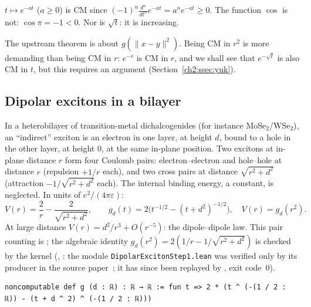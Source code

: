 \begin{example}
$t\mapsto e^{-at}$ ($a\ge0$) is CM since $(-1)^n\frac{d^n}{dt^n}e^{-at}=a^ne^{-at}\ge0$. The function $\cos$ is not:
$\cos\pi=-1<0$. Nor is $\sqrt t$: it is increasing.
\end{example}

\begin{remark}[why the variable $t=r^2$?]
The upstream theorem is about $g(\|x-y\|^2)$. Being CM in $r^2$ is more demanding than being CM in $r$: $e^{-r}$ is CM in $r$,
and we shall see that $e^{-\sqrt t}$ is also CM in $t$, but this requires an argument (Section~\ref{ch2:ssec:yuk}).
\end{remark}

\subsection{Dipolar excitons in a bilayer}\label{ch2:ssec:dip}

\begin{physbox}
In a heterobilayer of transition-metal dichalcogenides (for instance MoSe$_2$/WSe$_2$), an ``indirect'' exciton is an
electron in one layer, at height $d$, bound to a hole in the other layer, at height $0$, at the same in-plane position.
Two excitons at in-plane distance $r$ form four Coulomb pairs: electron--electron and hole--hole at distance $r$
(repulsion $+1/r$ each), and two cross pairs at distance $\sqrt{r^2+d^2}$ (attraction $-1/\sqrt{r^2+d^2}$ each). The
internal binding energy, a constant, is neglected. In units of $e^2/(4\pi\varepsilon)$:
\[V(r)=\frac2r-\frac2{\sqrt{r^2+d^2}},\qquad g_d(t)=2\bigl(t^{-1/2}-(t+d^2)^{-1/2}\bigr),\quad V(r)=g_d(r^2).\]
At large distance $V(r)=d^2/r^3+O(r^{-5})$: the dipole--dipole law. This pair counting is \tierC{}; the algebraic
identity $g_d(r^2)=2(1/r-1/\sqrt{r^2+d^2})$ is checked by the kernel (, \tierA{}: the module \texttt{DipolarExcitonStep1.lean} was verified only by its producer in the source paper~\cite{ch2dip}; it has since been replayed by , exit code~0).
\end{physbox}

\begin{leanbox}
\begin{lstlisting}[style=chdeux]
noncomputable def g (d : ℝ) : ℝ → ℝ := fun t => 2 * (t ^ (-(1 / 2 : ℝ)) - (t + d ^ 2) ^ (-(1 / 2 : ℝ)))
\end{lstlisting}
\end{leanbox}

